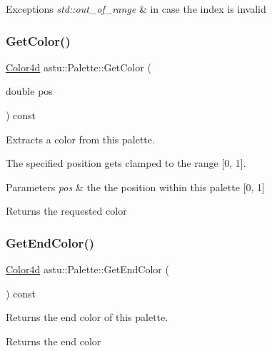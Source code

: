 \begin{DoxyExceptions}{Exceptions}
{\em std\+::out\+\_\+of\+\_\+range} & in case the index is invalid \\
\hline
\end{DoxyExceptions}
\mbox{\label{classastu_1_1Palette_afc6cac18675f8441307b895dfcd0282e}} 
\subsubsection{\texorpdfstring{Get\+Color()}{GetColor()}}
{\footnotesize\ttfamily \hyperlink{classastu_1_1Color}{Color4d} astu\+::\+Palette\+::\+Get\+Color (\begin{DoxyParamCaption}\item[{double}]{pos }\end{DoxyParamCaption}) const}

Extracts a color from this palette.

The specified position gets clamped to the range \mbox{[}0, 1\mbox{]}.


\begin{DoxyParams}{Parameters}
{\em pos} & the the position within this palette \mbox{[}0, 1\mbox{]} \\
\hline
\end{DoxyParams}
\begin{DoxyReturn}{Returns}
the requested color 
\end{DoxyReturn}
\mbox{\label{classastu_1_1Palette_aa67126acdc862688518f3aca13ecc80b}} 
\subsubsection{\texorpdfstring{Get\+End\+Color()}{GetEndColor()}}
{\footnotesize\ttfamily \hyperlink{classastu_1_1Color}{Color4d} astu\+::\+Palette\+::\+Get\+End\+Color (\begin{DoxyParamCaption}{ }\end{DoxyParamCaption}) const}

Returns the end color of this palette.

\begin{DoxyReturn}{Returns}
the end color 
\end{DoxyReturn}
\mbox{\label{classastu_1_1Palette_aaee594ef9056e05b7032714e7de810a6}} 
